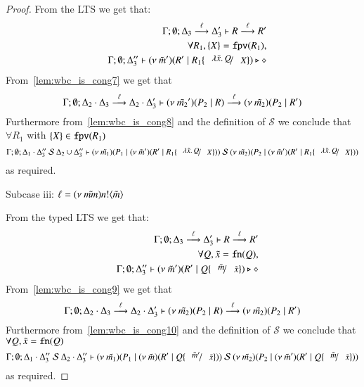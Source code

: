 \begin{proof}
	\noi From the LTS we get that:
	\begin{eqnarray}
		& &	\horel{\Gamma}{\Delta_3}{R}{\by{\ell}}{\Delta_3'}{R'}
			\label{lem:wbc_is_cong7}\\
		& & 	\forall R_1, \set{X} = \fpv{R_1},
			\nonumber\\
		& &	\Gamma; \emptyset; \Delta_3'' \proves \newsp{\tilde{m}'}{R' \Par R_1 \subst{\abs{\tilde{x}}{Q}}{X}} \hastype \Proc
			\label{lem:wbc_is_cong8}
	\end{eqnarray}
%
	\noi From~\ref{lem:wbc_is_cong7} we get that
	\[
		\horel{\Gamma}{\Delta_2 \cat \Delta_3}{\newsp{\tilde{m_2}'}{P_2 \Par R}}{\by{\ell}}{\Delta_2 \cat \Delta_3'}{\newsp{\tilde{m_2}}{P_2 \Par R'}}
	\]
	\noi Furthermore from~\ref{lem:wbc_is_cong8} and the definition of $\mathcal{S}$ we conclude that
	$\forall R_1$ with $\set{X} \in \fpv{R_1}$
	\[
		\horel{\Gamma}{\Delta_1 \cat \Delta_3''}{\newsp{\tilde{m_1}}{P_1 \Par \newsp{\tilde{m}'}{R' \Par R_1 \subst{\abs{\tilde{x}}{Q}}{X}}}}
		{\ \mathcal{S}\ }
		{\Delta_2 \cup \Delta_3''}{\newsp{\tilde{m_2}}{P_2 \Par \newsp{\tilde{m}'}{R' \Par R_1 \subst{\abs{\tilde{x}}{Q}}{X}}}}
	\]
	\noi as required.

	\noi Subcase iii: $\ell = \news{\tilde{mm}} \bactout{n}{\tilde{m}}$

	\noi From the typed LTS we get that:
	\begin{eqnarray}
		& &	\horel{\Gamma}{\Delta_3}{R}{\by{\ell}}{\Delta_3'}{R'}
			\label{lem:wbc_is_cong9} \\
		& &	\forall Q, \tilde{x} = \fn{Q}, \nonumber\\
		& &	\Gamma; \emptyset; \Delta_3'' \proves \newsp{\tilde{m}'}{R' \Par Q \subst{\tilde{m}}{\tilde{x}}} \hastype \Proc
			\label{lem:wbc_is_cong10}
	\end{eqnarray}
%
	\noi From~\ref{lem:wbc_is_cong9} we get that
	\[
		\horel{\Gamma}{\Delta_2 \cat \Delta_3}{\newsp{\tilde{m_2}}{P_2 \Par R}}{\by{\ell}}{\Delta_2 \cat \Delta_3'}{\newsp{\tilde{m_2}}{P_2 \Par R'}}
	\]
	\noi Furthermore from~\ref{lem:wbc_is_cong10} and the definition of $\mathcal{S}$ we conclude that
	$\forall Q, \tilde{x} = \fn{Q}$
	\[
		\horel{\Gamma}{\Delta_1 \cat \Delta_3''}{\newsp{\tilde{m_1}}{P_1 \Par \newsp{\tilde{m}}{R' \Par Q \subst{\tilde{m}'}{\tilde{x}}}}}
		{\ \mathcal{S}\ }
		{\Delta_2 \cat \Delta_3''}{\newsp{\tilde{m_2}}{P_2 \Par \newsp{\tilde{m}'}{R' \Par Q \subst{\tilde{m}}{\tilde{x}}}}}
	\]
	\noi as required.




\end{proof}
